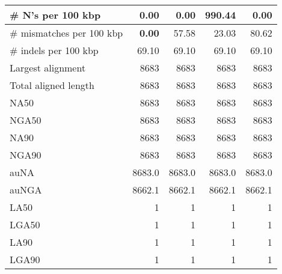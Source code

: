\documentclass[12pt,a4paper]{article}
\begin{document}
\begin{table}[ht]
\begin{center}
\begin{tabular}{|l*{4}{|r}|}
\# N's per 100 kbp & {\bf 0.00} & {\bf 0.00} & 990.44 & {\bf 0.00} \\ \hline
\# mismatches per 100 kbp & {\bf 0.00} & 57.58 & 23.03 & 80.62 \\ \hline
\# indels per 100 kbp & 69.10 & 69.10 & 69.10 & 69.10 \\ \hline
Largest alignment & 8683 & 8683 & 8683 & 8683 \\ \hline
Total aligned length & 8683 & 8683 & 8683 & 8683 \\ \hline
NA50 & 8683 & 8683 & 8683 & 8683 \\ \hline
NGA50 & 8683 & 8683 & 8683 & 8683 \\ \hline
NA90 & 8683 & 8683 & 8683 & 8683 \\ \hline
NGA90 & 8683 & 8683 & 8683 & 8683 \\ \hline
auNA & 8683.0 & 8683.0 & 8683.0 & 8683.0 \\ \hline
auNGA & 8662.1 & 8662.1 & 8662.1 & 8662.1 \\ \hline
LA50 & 1 & 1 & 1 & 1 \\ \hline
LGA50 & 1 & 1 & 1 & 1 \\ \hline
LA90 & 1 & 1 & 1 & 1 \\ \hline
LGA90 & 1 & 1 & 1 & 1 \\ \hline
\end{tabular}
\end{center}
\end{table}
\end{document}
